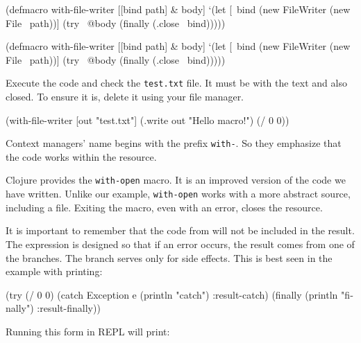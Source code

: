 
\ifnarrow

\begin{clojure}
(defmacro with-file-writer
  [[bind path] & body]
  `(let [~bind (new FileWriter
                 (new File ~path))]
     (try
       ~@body
       (finally
         (.close ~bind)))))
\end{clojure}

\else

\begin{clojure}
(defmacro with-file-writer
  [[bind path] & body]
  `(let [~bind (new FileWriter (new File ~path))]
     (try
       ~@body
       (finally
         (.close ~bind)))))
\end{clojure}

\fi

Execute the code and check the \verb|test.txt| file. It must be with the text and also closed. To ensure it is, delete it using your file manager.

\begin{clojure}
(with-file-writer [out "test.txt"]
  (.write out "Hello macro!")
  (/ 0 0))
\end{clojure}

Context managers' name begins with the prefix \verb|with-|. So they emphasize that the code works within the resource.


Clojure provides the \verb|with-open| macro. It is an improved version of the code we have written. Unlike our example, \verb|with-open| works with a more abstract source, including a file. Exiting the macro, even with an error, closes the resource.

It is important to remember that the code from  will not be included in the result. The  expression is designed so that if an error occurs, the result comes from one of the  branches. The  branch serves only for side effects. This is best seen in the example with printing:

\begin{english}
  \begin{clojure}
(try (/ 0 0)
     (catch Exception e
       (println "catch")
       :result-catch)
     (finally
       (println "finally")
       :result-finally))
  \end{clojure}
\end{english}

\noindentnarrow
Running this form in REPL will print:

